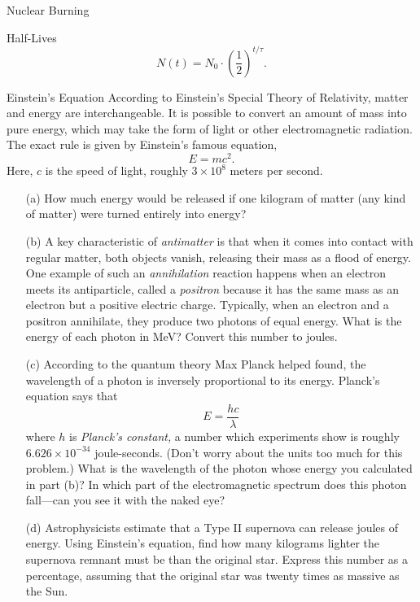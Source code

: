 \documentclass[12pt]{article}
\begin{document}
\begin{probdesc}{6}{Nuclear Burning}
\end{probdesc}

\begin{probdesc}{7}{Half-Lives}
\begin{equation}
N(t) = N_0 \cdot \left(\frac{1}{2}\right)^{t / \tau}.
\end{equation}
\end{probdesc}

\begin{probdesc}{8}{Einstein's Equation}
According to Einstein's Special Theory of Relativity, matter and
energy are interchangeable.  It is possible to convert an amount of
mass into pure energy, which may take the form of light or other
electromagnetic radiation.  The exact rule is given by Einstein's
famous equation,
\begin{equation}
E = mc^2.
\end{equation}
Here, $c$ is the speed of light, roughly $3\times10^8$ meters per
second.
\begin{enumerate}
\item[(a)] How much energy would be released if one kilogram of matter (any
  kind of matter) were turned entirely into energy?

\item[(b)] A key characteristic of {\em antimatter} is that when it comes
  into contact with regular matter, both objects vanish, releasing
  their mass as a flood of energy.  One example of such an {\em
  annihilation} reaction happens when an electron meets its
  antiparticle, called a {\em positron} because it has the same mass
  as an electron but a positive electric charge.  Typically, when an
  electron and a positron annihilate, they produce two photons of
  equal energy.  What is the energy of each photon in MeV?  Convert
  this number to joules.

\item[(c)] According to the quantum theory Max Planck helped found, the
  wavelength of a photon is inversely proportional to its energy.
  Planck's equation says that
  \begin{equation}
    E = \frac{hc}{\lambda}
  \end{equation}
  where $h$ is {\em Planck's constant,} a number which experiments
  show is roughly $6.626\times10^{-34}$ joule-seconds.  (Don't worry
  about the units too much for this problem.)  What is the wavelength
  of the photon whose energy you calculated in part (b)?  In which
  part of the electromagnetic spectrum does this photon fall---can you
  see it with the naked eye?

\item[(d)] Astrophysicists estimate that a Type II supernova can release
  joules of energy.  Using Einstein's equation, find how many
  kilograms lighter the supernova remnant must be than the original
  star.  Express this number as a percentage, assuming that the
  original star was twenty times as massive as the Sun.
\end{enumerate}
\end{probdesc}
\end{document}
